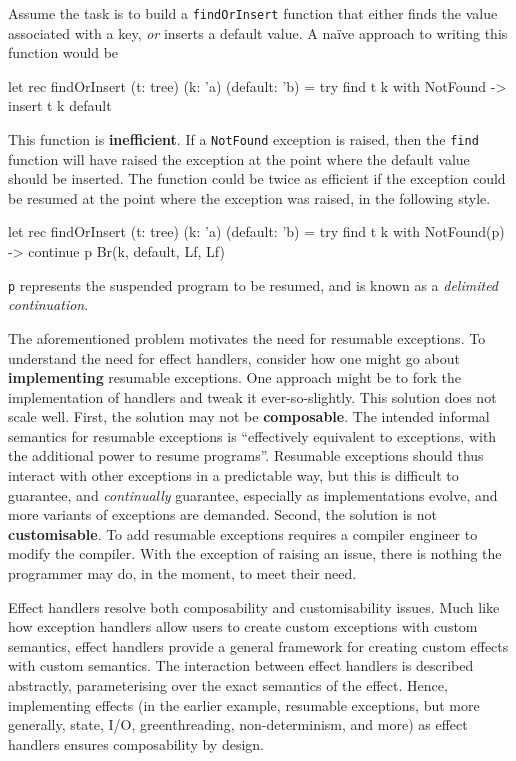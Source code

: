 Assume the task is to build a \texttt{findOrInsert} function that either finds the value associated with a key, \textit{or} inserts a default value. A naïve approach to writing this function would be
\begin{ocaml}  
let rec findOrInsert (t: tree) (k: 'a) (default: 'b) = 
  try find t k with NotFound -> insert t k default
\end{ocaml}
This function is \textbf{inefficient}. If a \texttt{NotFound} exception is raised, then the \texttt{find} function will have raised the exception at the point where the default value should be inserted. The function could be twice as efficient if the exception could be resumed at the point where the exception was raised, in the following style.
\begin{ocaml}
let rec findOrInsert (t: tree) (k: 'a) (default: 'b) = 
  try find t k with NotFound(p) -> continue p Br(k, default, Lf, Lf)
\end{ocaml}
\texttt{p} represents the suspended program to be resumed, and is known as a \textit{delimited continuation}.

The aforementioned problem motivates the need for resumable exceptions. To understand the need for effect handlers, consider how one might go about \textbf{implementing} resumable exceptions. One approach might be to fork the implementation of handlers and tweak it ever-so-slightly. This solution does not scale well. First, the solution may not be \textbf{composable}. The intended informal semantics for resumable exceptions is ``effectively equivalent to exceptions, with the additional power to resume programs''. Resumable exceptions should thus interact with other exceptions in a predictable way, but this is difficult to guarantee, and \textit{continually} guarantee, especially as implementations evolve, and more variants of exceptions are demanded. Second, the solution is not \textbf{customisable}. To add resumable exceptions requires a compiler engineer to modify the compiler. With the exception of raising an issue, there is nothing the programmer may do, in the moment, to meet their need.

Effect handlers resolve both composability and customisability issues. Much like how exception handlers allow users to create custom exceptions with custom semantics, effect handlers provide a general framework for creating custom effects with custom semantics. The interaction between effect handlers is described abstractly, parameterising over the exact semantics of the effect. Hence, implementing effects (in the earlier example, resumable exceptions, but more generally, state, I/O, greenthreading, non-determinism, and more) as effect handlers ensures composability by design. 

